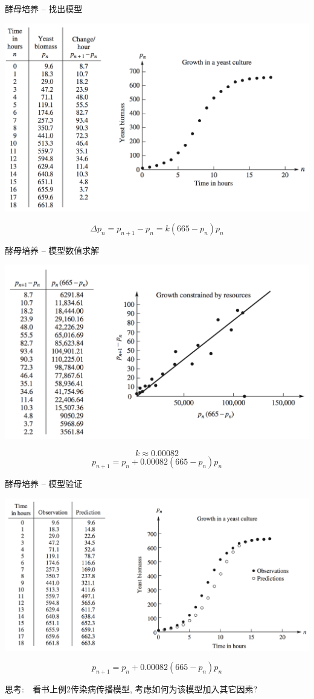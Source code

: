 \documentclass[UTF8]{ctexbeamer}
\begin{document}
\begin{frame}{酵母培养 -- 找出模型}
  \begin{center}
    \includegraphics[width=.8\textwidth{}]{yeast.png}
  \end{center}

  \[
  \Delta p_n = p_{n+1} - p_n = k(665 - p_n)p_n
  \]
\end{frame}

\begin{frame}{酵母培养 -- 模型数值求解}
  \begin{center}
    \includegraphics[width=.8\textwidth{}]{yeast-fit.png}
  \end{center}
  \[
  k \approx 0.00082
  \]
  \[
  p_{n+1} = p_n + 0.00082(665 - p_n)p_n
  \]  
\end{frame}

\begin{frame}{酵母培养 -- 模型验证}
  \begin{center}
    \includegraphics[width=.8\textwidth{}]{yeast-verify.png}
  \end{center}
  \[
  p_{n+1} = p_n + 0.00082(665 - p_n)p_n
  \]

思考:　看书上例2传染病传播模型, 考虑如何为该模型加入其它因素?
\end{frame}
\end{document}

